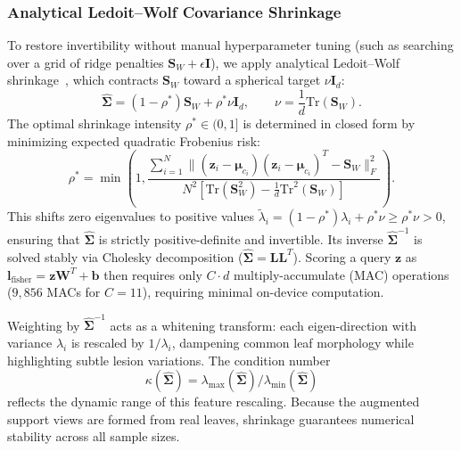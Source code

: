 \documentclass[preprint,12pt]{elsarticle}
\begin{document}
\subsubsection{Analytical Ledoit--Wolf Covariance Shrinkage}
\label{sec:shrinkage}
To restore invertibility without manual hyperparameter tuning (such as searching over a grid of ridge penalties $\mathbf{S}_W + \epsilon \mathbf{I}$), we apply analytical Ledoit--Wolf shrinkage~\cite{ledoit2004well}, which contracts $\mathbf{S}_W$ toward a spherical target $\nu \mathbf{I}_d$:
\begin{equation}
    \hat{\mathbf{\Sigma}} = (1 - \rho^*)\mathbf{S}_W + \rho^* \nu \mathbf{I}_d, \qquad \nu = \frac{1}{d}\text{Tr}(\mathbf{S}_W).
    \label{eq:lw_target}
\end{equation}
The optimal shrinkage intensity $\rho^* \in (0, 1]$ is determined in closed form by minimizing expected quadratic Frobenius risk:
\begin{equation}
    \rho^* = \min\left(1, \frac{\sum_{i=1}^N \|(\mathbf{z}_i - \boldsymbol{\mu}_{c_i})(\mathbf{z}_i - \boldsymbol{\mu}_{c_i})^T - \mathbf{S}_W\|_F^2}{N^2 \left[\text{Tr}(\mathbf{S}_W^2) - \frac{1}{d}\text{Tr}^2(\mathbf{S}_W)\right]}\right).
    \label{eq:lw_shrinkage}
\end{equation}
This shifts zero eigenvalues to positive values $\tilde{\lambda}_i = (1 - \rho^*)\lambda_i + \rho^* \nu \ge \rho^* \nu > 0$, ensuring that $\hat{\mathbf{\Sigma}}$ is strictly positive-definite and invertible. Its inverse $\hat{\mathbf{\Sigma}}^{-1}$ is solved stably via Cholesky decomposition ($\hat{\mathbf{\Sigma}} = \mathbf{L}\mathbf{L}^T$). Scoring a query $\mathbf{z}$ as $\mathbf{l}_{\text{fisher}} = \mathbf{z}\mathbf{W}^T + \mathbf{b}$ then requires only $C \cdot d$ multiply-accumulate (MAC) operations ($9{,}856$ MACs for $C=11$), requiring minimal on-device computation.

Weighting by $\hat{\mathbf{\Sigma}}^{-1}$ acts as a whitening transform: each eigen-direction with variance $\lambda_i$ is rescaled by $1/\lambda_i$, dampening common leaf morphology while highlighting subtle lesion variations. The condition number
\begin{equation}
    \kappa(\hat{\mathbf{\Sigma}}) = \lambda_{\max}(\hat{\mathbf{\Sigma}}) / \lambda_{\min}(\hat{\mathbf{\Sigma}})
    \label{eq:whitening_spread}
\end{equation}
reflects the dynamic range of this feature rescaling. Because the augmented support views are formed from real leaves, shrinkage guarantees numerical stability across all sample sizes.
\end{document}
